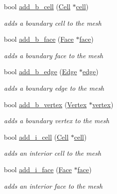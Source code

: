\begin{DoxyCompactItemize}
bool \hyperlink{group__Mesh_ga31f05cf2b4cbb3dd729e99f96345dbbe}{add\+\_\+b\+\_\+cell} (\hyperlink{classHArDCore3D_1_1Cell}{Cell} $\ast$\hyperlink{classHArDCore3D_1_1Mesh_ae07b938c57cf57e3bb9c76d3df1eb549}{cell})
\begin{DoxyCompactList}\small\item\em adds a boundary cell to the mesh \end{DoxyCompactList}\item 
bool \hyperlink{group__Mesh_ga3efbbd1fc6718b9110bc08cc0225471c}{add\+\_\+b\+\_\+face} (\hyperlink{classHArDCore3D_1_1Face}{Face} $\ast$\hyperlink{classHArDCore3D_1_1Mesh_a09d8a0ee1f515991b06a3517e33a894e}{face})
\begin{DoxyCompactList}\small\item\em adds a boundary face to the mesh \end{DoxyCompactList}\item 
bool \hyperlink{group__Mesh_gadf0072fd6a1ca4a2b99563ab875202fd}{add\+\_\+b\+\_\+edge} (\hyperlink{classHArDCore3D_1_1Edge}{Edge} $\ast$\hyperlink{classHArDCore3D_1_1Mesh_acad7cdf3d2c00fa6fc23ff77c63c7d1a}{edge})
\begin{DoxyCompactList}\small\item\em adds a boundary edge to the mesh \end{DoxyCompactList}\item 
bool \hyperlink{group__Mesh_ga6495493613a7e8453473cce4838b7dc8}{add\+\_\+b\+\_\+vertex} (\hyperlink{classHArDCore3D_1_1Vertex}{Vertex} $\ast$\hyperlink{classHArDCore3D_1_1Mesh_ad099224c697c05a57fad6a47fdcd9e76}{vertex})
\begin{DoxyCompactList}\small\item\em adds a boundary vertex to the mesh \end{DoxyCompactList}\item 
bool \hyperlink{group__Mesh_gaecf50e57da45ad71c485f1e3f51d82ea}{add\+\_\+i\+\_\+cell} (\hyperlink{classHArDCore3D_1_1Cell}{Cell} $\ast$\hyperlink{classHArDCore3D_1_1Mesh_ae07b938c57cf57e3bb9c76d3df1eb549}{cell})
\begin{DoxyCompactList}\small\item\em adds an interior cell to the mesh \end{DoxyCompactList}\item 
bool \hyperlink{group__Mesh_ga11ec925f03b38f68cc942c096a93af19}{add\+\_\+i\+\_\+face} (\hyperlink{classHArDCore3D_1_1Face}{Face} $\ast$\hyperlink{classHArDCore3D_1_1Mesh_a09d8a0ee1f515991b06a3517e33a894e}{face})
\begin{DoxyCompactList}\small\item\em adds an interior face to the mesh \end{DoxyCompactList}\item 

\end{DoxyCompactItemize}
